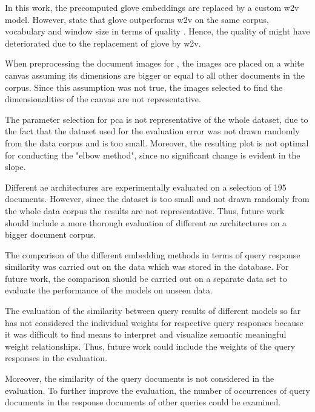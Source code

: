In this work, the precomputed \ac{glove} embeddings are replaced by a custom \ac{w2v} model.
However, \citeauthor{glove2014} state that \acs{glove} outperforms \ac{w2v} on the same corpus, 
vocabulary and window size in terms of quality \cite{glove2014}.
Hence, the quality of \infersent{} might have deteriorated due to the replacement of \ac{glove} by \ac{w2v}.

When preprocessing the document images for \eigendocs{}, the images are placed on a white canvas assuming 
its dimensions are bigger or equal to all other documents in the corpus.
Since this assumption was not true, the images selected to find the dimensionalities of the canvas are not representative.

The parameter selection for \ac{pca} is not representative of the whole dataset, 
due to the fact that the dataset used for the evaluation error was not drawn randomly from the data corpus and is too small.
Moreover, the resulting plot is not optimal for conducting the "elbow method", since no significant change is evident in the slope.


Different \ac{ae} architectures are experimentally evaluated on a selection of 195 documents.
However, since the dataset is too small and not drawn randomly from the whole data corpus the results are not representative.
Thus, future work should include a more thorough evaluation of different \ac{ae} architectures on a bigger document corpus.

The comparison of the different embedding methods in terms of query response similarity was carried out on the data which was stored in the database.
For future work, the comparison should be carried out on a separate data set to evaluate the performance of the models on unseen data.

The evaluation of the similarity between query results of different models so far 
has not considered the individual weights for respective query responses
because it was difficult to find means 
to interpret and visualize semantic meaningful weight relationships.
Thus, future work could include the weights of the query responses in the evaluation.

Moreover, the similarity of the query documents is not considered in the evaluation.
To further improve the evaluation, the number of occurrences of query documents in the response documents of other queries could be examined.

